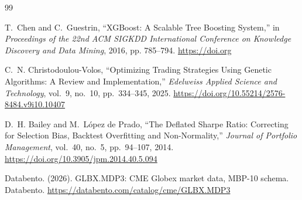 \documentclass[11pt,letterpaper]{article}
\begin{document}
\begin{thebibliography}{99}
\small

T.~Chen and C.~Guestrin,
``XGBoost: A Scalable Tree Boosting System,''
in \textit{Proceedings of the 22nd ACM SIGKDD International Conference on Knowledge Discovery and Data Mining}, 2016, pp. 785--794.
\url{https://doi.org}

C.~N. Christodoulou-Volos,
``Optimizing Trading Strategies Using Genetic Algorithms: A Review and Implementation,''
\textit{Edelweiss Applied Science and Technology}, vol.~9, no.~10, pp.~334--345, 2025.
\url{https://doi.org/10.55214/2576-8484.v9i10.10407}

D.~H. Bailey and M.~L\'opez de Prado,
``The Deflated Sharpe Ratio: Correcting for Selection Bias, Backtest Overfitting and Non-Normality,''
\textit{Journal of Portfolio Management}, vol.~40, no.~5, pp.~94--107, 2014.
\url{https://doi.org/10.3905/jpm.2014.40.5.094}

Databento. (2026). GLBX.MDP3: CME Globex market data, MBP-10 schema. Databento.
\url{https://databento.com/catalog/cme/GLBX.MDP3}

\end{thebibliography}
 
\end{document}
